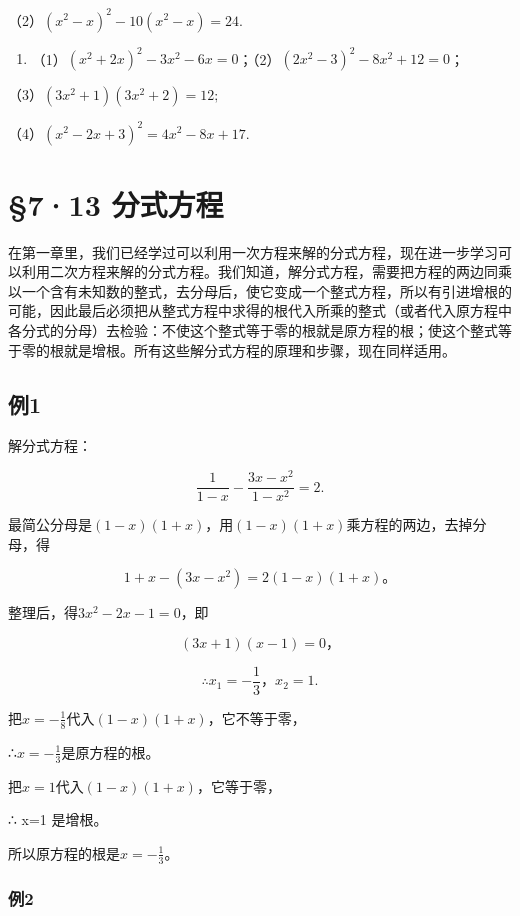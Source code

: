 （2）\((x^{2} - x)^{2} - 10(x^{2} - x) = 24.\)

\begin{enumerate}[start=3]
\item
  （1）\((x^{2} + 2x)^{2} - 3x^{2} - 6x = 0\)；（2）\((2x^{2} - 3)^{2} - 8x^{2} + 12 = 0\)；
\end{enumerate}

（3）\((3x^{2} + 1)(3x^{2} + 2) = 12;\)

（4）\((x^{2} - 2x + 3)^{2} = 4x^{2} - 8x + 17.\)

\section{§7·13 分式方程}

在第一章里，我们已经学过可以利用一次方程来解的分式方程，现在进一步学习可以利用二次方程来解的分式方程。我们知道，解分式方程，需要把方程的两边同乘以一个含有未知数的整式，去分母后，使它变成一个整式方程，所以有引进增根的可能，因此最后必须把从整式方程中求得的根代入所乘的整式（或者代入原方程中各分式的分母）去检验：不使这个整式等于零的根就是原方程的根；使这个整式等于零的根就是增根。所有这些解分式方程的原理和步骤，现在同样适用。

\subsection{例1}

解分式方程：

\[
\frac{1}{1 - x} - \frac{3 x - x ^ {2}}{1 - x ^ {2}} = 2.
\]

最简公分母是\((1 - x)(1 + x)\)，用\((1 - x)(1 + x)\)乘方程的两边，去掉分母，得

\[
1 + x - (3 x - x ^ {2}) = 2 (1 - x) (1 + x)\text{。}
\]

整理后，得\(3x^{2} - 2x - 1 = 0\)，即

\[
(3 x + 1) (x - 1) = 0\text{，}
\]

\[
\therefore x _ {1} = - \frac{1}{3}\text{，} x _ {2} = 1.
\]

把\(x = -\frac{1}{8}\)代入\((1 - x)(1 + x)\)，它不等于零，

∴\(x = -\frac{1}{3}\)是原方程的根。

把\(x = 1\)代入\((1 - x)(1 + x)\)，它等于零，

∴ x=1 是增根。

所以原方程的根是\(x = -\frac{1}{3}\)。

\subsubsection{例2}

